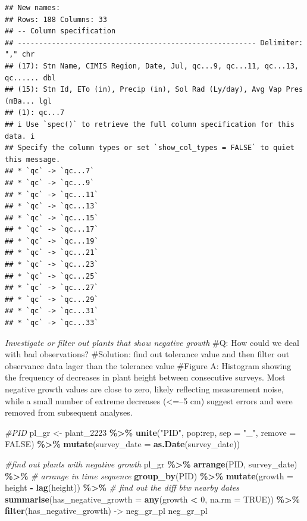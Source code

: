 \documentclass[
]{article}
\newenvironment{Shaded}{\begin{snugshade}}{\end{snugshade}}
\newcommand{\AttributeTok}[1]{\textcolor[rgb]{0.13,0.29,0.53}{#1}}
\newcommand{\CommentTok}[1]{\textcolor[rgb]{0.56,0.35,0.01}{\textit{#1}}}
\newcommand{\ConstantTok}[1]{\textcolor[rgb]{0.56,0.35,0.01}{#1}}
\newcommand{\DecValTok}[1]{\textcolor[rgb]{0.00,0.00,0.81}{#1}}
\newcommand{\FunctionTok}[1]{\textcolor[rgb]{0.13,0.29,0.53}{\textbf{#1}}}
\newcommand{\NormalTok}[1]{#1}
\newcommand{\OtherTok}[1]{\textcolor[rgb]{0.56,0.35,0.01}{#1}}
\newcommand{\SpecialCharTok}[1]{\textcolor[rgb]{0.81,0.36,0.00}{\textbf{#1}}}
\newcommand{\StringTok}[1]{\textcolor[rgb]{0.31,0.60,0.02}{#1}}
\begin{document}
\begin{verbatim}
## New names:
## Rows: 188 Columns: 33
## -- Column specification
## -------------------------------------------------------- Delimiter: "," chr
## (17): Stn Name, CIMIS Region, Date, Jul, qc...9, qc...11, qc...13, qc...... dbl
## (15): Stn Id, ETo (in), Precip (in), Sol Rad (Ly/day), Avg Vap Pres (mBa... lgl
## (1): qc...7
## i Use `spec()` to retrieve the full column specification for this data. i
## Specify the column types or set `show_col_types = FALSE` to quiet this message.
## * `qc` -> `qc...7`
## * `qc` -> `qc...9`
## * `qc` -> `qc...11`
## * `qc` -> `qc...13`
## * `qc` -> `qc...15`
## * `qc` -> `qc...17`
## * `qc` -> `qc...19`
## * `qc` -> `qc...21`
## * `qc` -> `qc...23`
## * `qc` -> `qc...25`
## * `qc` -> `qc...27`
## * `qc` -> `qc...29`
## * `qc` -> `qc...31`
## * `qc` -> `qc...33`
\end{verbatim}

\emph{Investigate or filter out plants that show negative growth} \#Q:
How could we deal with bad observations? \#Solution: find out tolerance
value and then filter out observance data lager than the tolerance value
\#Figure A: Histogram showing the frequency of decreases in plant height
between consecutive surveys. Most negative growth values are close to
zero, likely reflecting measurement noise, while a small number of
extreme decreases (\textless=--5 cm) suggest errors and were removed
from subsequent analyses.

\begin{Shaded}
\begin{Highlighting}[]
\CommentTok{\#PID}
\NormalTok{pl\_gr }\OtherTok{\textless{}{-}}\NormalTok{ plant\_2223 }\SpecialCharTok{\%\textgreater{}\%}
  \FunctionTok{unite}\NormalTok{(}\StringTok{"PID"}\NormalTok{, pop}\SpecialCharTok{:}\NormalTok{rep, }\AttributeTok{sep =} \StringTok{"\_"}\NormalTok{, }\AttributeTok{remove =} \ConstantTok{FALSE}\NormalTok{) }\SpecialCharTok{\%\textgreater{}\%}
  \FunctionTok{mutate}\NormalTok{(}\AttributeTok{survey\_date =} \FunctionTok{as.Date}\NormalTok{(survey\_date))}

\CommentTok{\#find out plants with negative growth}
\NormalTok{pl\_gr }\SpecialCharTok{\%\textgreater{}\%}
  \FunctionTok{arrange}\NormalTok{(PID, survey\_date) }\SpecialCharTok{\%\textgreater{}\%}  \CommentTok{\# arrange in time sequence}
  \FunctionTok{group\_by}\NormalTok{(PID) }\SpecialCharTok{\%\textgreater{}\%}
  \FunctionTok{mutate}\NormalTok{(}\AttributeTok{growth =}\NormalTok{ height }\SpecialCharTok{{-}} \FunctionTok{lag}\NormalTok{(height)) }\SpecialCharTok{\%\textgreater{}\%}  \CommentTok{\# find out the diff btw nearby dates}
  \FunctionTok{summarise}\NormalTok{(}\AttributeTok{has\_negative\_growth =} \FunctionTok{any}\NormalTok{(growth }\SpecialCharTok{\textless{}} \DecValTok{0}\NormalTok{, }\AttributeTok{na.rm =} \ConstantTok{TRUE}\NormalTok{)) }\SpecialCharTok{\%\textgreater{}\%} 
  \FunctionTok{filter}\NormalTok{(has\_negative\_growth) }\OtherTok{{-}\textgreater{}}\NormalTok{ neg\_gr\_pl}
\NormalTok{neg\_gr\_pl}
\end{Highlighting}
\end{Shaded}
\end{document}

